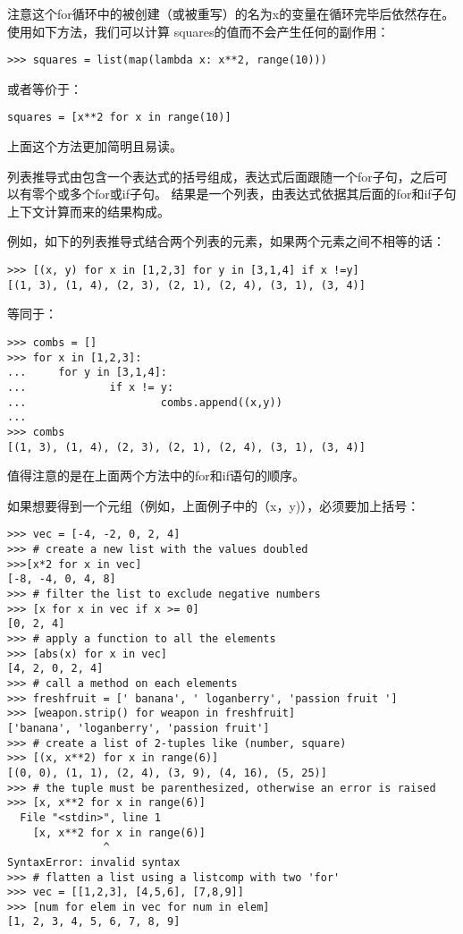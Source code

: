 \documentclass[UTF8]{ctexart}
\begin{document}
注意这个for循环中的被创建（或被重写）的名为x的变量在循环完毕后依然存在。使用如下方法，我们可以计算
squares的值而不会产生任何的副作用：
\begin{verbatim}
>>> squares = list(map(lambda x: x**2, range(10)))
\end{verbatim}

或者等价于：
\begin{verbatim}
squares = [x**2 for x in range(10)]
\end{verbatim}

上面这个方法更加简明且易读。

列表推导式由包含一个表达式的括号组成，表达式后面跟随一个for子句，之后可以有零个或多个for或if子句。
结果是一个列表，由表达式依据其后面的for和if子句上下文计算而来的结果构成。

例如，如下的列表推导式结合两个列表的元素，如果两个元素之间不相等的话：
\begin{verbatim}
>>> [(x, y) for x in [1,2,3] for y in [3,1,4] if x !=y]
[(1, 3), (1, 4), (2, 3), (2, 1), (2, 4), (3, 1), (3, 4)]
\end{verbatim}

等同于：
\begin{verbatim}
>>> combs = []
>>> for x in [1,2,3]:
...     for y in [3,1,4]:
...             if x != y:
...                     combs.append((x,y))
...
>>> combs
[(1, 3), (1, 4), (2, 3), (2, 1), (2, 4), (3, 1), (3, 4)]
\end{verbatim}

值得注意的是在上面两个方法中的for和if语句的顺序。

如果想要得到一个元组（例如，上面例子中的（x，y)），必须要加上括号：
\begin{verbatim}
>>> vec = [-4, -2, 0, 2, 4]
>>> # create a new list with the values doubled
>>>[x*2 for x in vec]
[-8, -4, 0, 4, 8]
>>> # filter the list to exclude negative numbers
>>> [x for x in vec if x >= 0]
[0, 2, 4]
>>> # apply a function to all the elements
>>> [abs(x) for x in vec]
[4, 2, 0, 2, 4]
>>> # call a method on each elements
>>> freshfruit = [' banana', ' loganberry', 'passion fruit ']
>>> [weapon.strip() for weapon in freshfruit]
['banana', 'loganberry', 'passion fruit']
>>> # create a list of 2-tuples like (number, square)
>>> [(x, x**2) for x in range(6)]
[(0, 0), (1, 1), (2, 4), (3, 9), (4, 16), (5, 25)]
>>> # the tuple must be parenthesized, otherwise an error is raised
>>> [x, x**2 for x in range(6)]
  File "<stdin>", line 1
    [x, x**2 for x in range(6)]
               ^
SyntaxError: invalid syntax
>>> # flatten a list using a listcomp with two 'for'
>>> vec = [[1,2,3], [4,5,6], [7,8,9]]
>>> [num for elem in vec for num in elem]
[1, 2, 3, 4, 5, 6, 7, 8, 9]
\end{verbatim}
\end{document}
